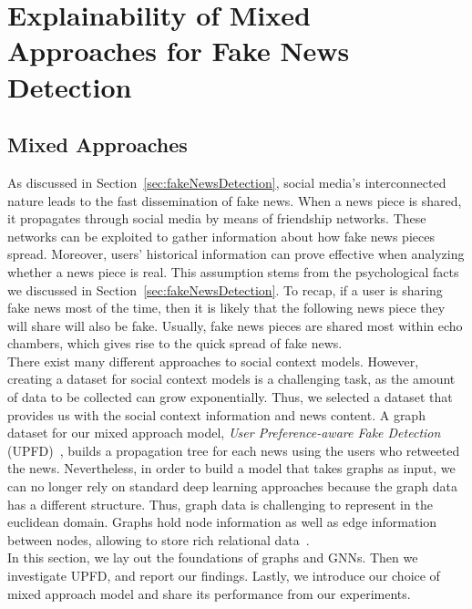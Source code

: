 
\chapter{Explainability of Mixed Approaches for Fake News Detection}\label{chapter:MixedApproachesForFND}

\section{Mixed Approaches}
\label{sec:mixedApproaches}
As discussed in Section~\ref{sec:fakeNewsDetection}, social media's interconnected nature leads to the fast dissemination of
fake news. When a news piece is shared, it propagates through social media by means of friendship networks. These networks
can be exploited to gather information about how fake news pieces spread. Moreover, users' historical information can prove effective when analyzing whether a news piece is real. This assumption stems from the psychological facts we discussed in Section~\ref{sec:fakeNewsDetection}. To recap, if a user is sharing fake news most of the time, then it is likely that the following news piece they will share will also be fake. Usually, fake news pieces are shared most within echo chambers, which gives rise to the quick spread of fake news.\\
There exist many different approaches to social context models. However, creating a dataset for social context models is a challenging task, as the amount of data to be collected can grow exponentially. Thus, we selected a dataset that provides us with the social context information and news content. A graph dataset for our mixed approach model, \emph{User Preference-aware Fake Detection} (UPFD)~\parencite{UPFD_Dataset_Shu}, builds a propagation tree for each news using the users who retweeted the news. Nevertheless, in order to build a model that takes graphs as input, we can no longer rely on standard deep learning approaches because the graph data has a different structure. Thus, graph data is challenging to represent in the euclidean domain. Graphs hold node information as well as edge information between nodes, allowing to store rich relational data~\parencite{DeepLearningOnGraphs_Zhang}.\\
In this section, we lay out the foundations of graphs and GNNs. Then we investigate UPFD, and report our findings. Lastly, we introduce our choice of mixed approach model and share its performance from our experiments.

